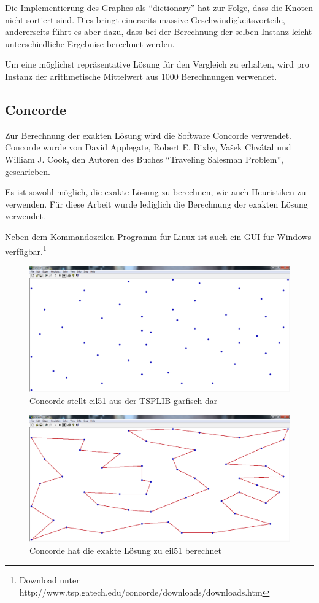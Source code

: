 \documentclass[11pt,a4paper]{article}
\begin{document}
Die Implementierung des Graphes als "`dictionary"' hat zur Folge, dass die Knoten nicht sortiert sind. Dies bringt einerseits massive Geschwindigkeitsvorteile, andererseits führt es aber dazu, dass bei der Berechnung der selben Instanz leicht unterschiedliche Ergebnise berechnet werden.

Um eine möglichst repräsentative Lösung für den Vergleich zu erhalten, wird pro Instanz der arithmetische Mittelwert aus 1000 Berechnungen verwendet.

\subsection{Concorde}
Zur Berechnung der exakten Lösung wird die Software Concorde verwendet. Concorde wurde von David Applegate, Robert E. Bixby, Vašek Chvátal und William J. Cook, den Autoren des Buches "`Traveling Salesman Problem"'\cite{applegate06}, geschrieben.

Es ist sowohl möglich, die exakte Lösung zu berechnen, wie auch Heuristiken zu verwenden. Für diese Arbeit wurde lediglich die Berechnung der exakten Lösung verwendet.

Neben dem Kommandozeilen-Programm für Linux ist auch ein GUI für Windows verfügbar.\footnote{Download unter http://www.tsp.gatech.edu/concorde/downloads/downloads.htm}

\begin{figure}[H]
        \centering
        \includegraphics[width=14cm]{gfx/concorde_cities}
        \caption{Concorde stellt eil51 aus der TSPLIB garfisch dar}
        \label{img:concorde_cities}
\end{figure}

\begin{figure}[H]
        \centering
        \includegraphics[width=14cm]{gfx/concorde_solution}
        \caption{Concorde hat die exakte Lösung zu eil51 berechnet}
        \label{img:concorde_solution}
\end{figure}
\end{document}
